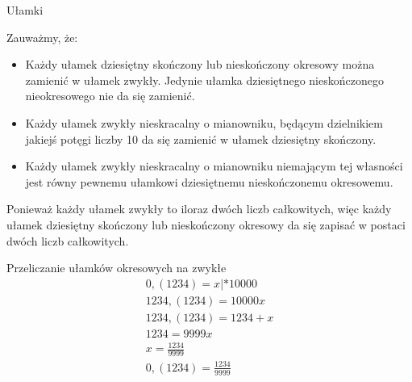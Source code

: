 \begin{frame}{Ułamki}
    \begin{justify}
        Zauważmy, że:
        \begin{itemize}
            \item Każdy ułamek dziesiętny skończony lub nieskończony okresowy można zamienić w ułamek zwykły.
            Jedynie ułamka dziesiętnego nieskończonego nieokresowego nie da się zamienić. \\
            \item Każdy ułamek zwykły nieskracalny o mianowniku, będącym dzielnikiem
            jakiejś potęgi liczby 10 da się zamienić w ułamek dziesiętny skończony. \\
            \item Każdy ułamek zwykły nieskracalny o mianowniku niemającym tej własności
            jest równy pewnemu ułamkowi dziesiętnemu nieskończonemu okresowemu. \\
        \end{itemize}

        Ponieważ każdy ułamek zwykły to iloraz dwóch liczb całkowitych, więc każdy ułamek dziesiętny
        skończony lub nieskończony okresowy da się zapisać w postaci dwóch liczb całkowitych.
    \end{justify}
\end{frame}
\begin{frame}{Przeliczanie ułamków okresowych na zwykłe}
    \begin{gather*}
        0,(1234) = x | * 10000 \\
        1234,(1234) = 10000x \\
        1234,(1234) = 1234 + x \\
        1234 = 9999x \\
        x = \frac{1234}{9999} \\
        0,(1234) = \frac{1234}{9999} \\
    \end{gather*}
\end{frame}

